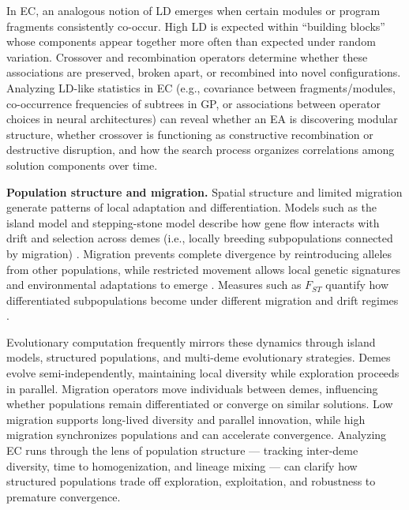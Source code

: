 In EC, an analogous notion of LD emerges when certain modules or program fragments consistently co-occur.
High LD is expected within ``building blocks'' whose components appear together more often than expected under random variation.
Crossover and recombination operators determine whether these associations are preserved, broken apart, or recombined into novel configurations.
Analyzing LD-like statistics in EC (e.g., covariance between fragments/modules, co-occurrence frequencies of subtrees in GP, or associations between operator choices in neural architectures) can reveal whether an EA is discovering modular structure, whether crossover is functioning as constructive recombination or destructive disruption, and how the search process organizes correlations among solution components over time.

\textbf{Population structure and migration.}
Spatial structure and limited migration generate patterns of local adaptation and differentiation.
Models such as the island model and stepping-stone model describe how gene flow interacts with drift and selection across demes (i.e., locally breeding subpopulations connected by migration) \citep{hamilton2021population}.
Migration prevents complete divergence by reintroducing alleles from other populations, while restricted movement allows local genetic signatures and environmental adaptations to emerge \citep{hamilton2021population}.
Measures such as $F_{ST}$ quantify how differentiated subpopulations become under different migration and drift regimes \citep{wright1949genetical}.

Evolutionary computation frequently mirrors these dynamics through island models, structured populations, and multi-deme evolutionary strategies.
Demes evolve semi-independently, maintaining local diversity while exploration proceeds in parallel.
Migration operators move individuals between demes, influencing whether populations remain differentiated or converge on similar solutions.
Low migration supports long-lived diversity and parallel innovation, while high migration synchronizes populations and can accelerate convergence.
Analyzing EC runs through the lens of population structure --- tracking inter-deme diversity, time to homogenization, and lineage mixing --- can clarify how structured populations trade off exploration, exploitation, and robustness to premature convergence.

